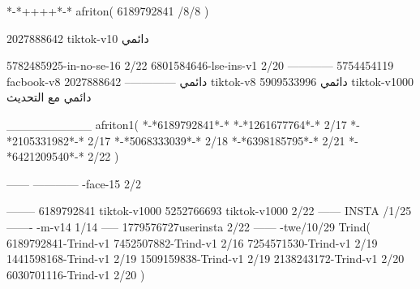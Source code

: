 *-*++++*-*
afriton(
6189792841 /8/8
)

2027888642 tiktok-v10
دائمي

5782485925-in-no-se-16 2/22
6801584646-lse-ins-v1 2/20
------------
5754454119 facbook-v8
دائمي
--------------
2027888642 tiktok-v8
دائمي
5909533996 tiktok-v1000
دائمي مع التحديث

__________
afriton1(
*-*6189792841*-*
*-*1261677764*-* 2/17
*-*2105331982*-* 2/17
*-*5068333039*-* 2/18
*-*6398185795*-* 2/21
*-*6421209540*-* 2/22
)

------
------------
-face-15 2/2

--------
6189792841 tiktok-v1000
5252766693 tiktok-v1000 2/22
------
 INSTA /1/25
-------
-m-v14 1/14
-----
1779576727userinsta 2/22
------
-twe/10/29
Trind(
6189792841-Trind-v1 
7452507882-Trind-v1 2/16
7254571530-Trind-v1 2/19
1441598168-Trind-v1 2/19
1509159838-Trind-v1 2/19
2138243172-Trind-v1 2/20
6030701116-Trind-v1 2/20
)
